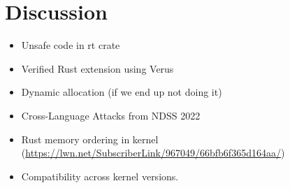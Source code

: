 \section{Discussion}
\begin{itemize}
    \item Unsafe code in rt crate
    \item Verified Rust extension using Verus
    \item Dynamic allocation (if we end up not doing it)
    \item Cross-Language Attacks from NDSS 2022
    \item Rust memory ordering in kernel (\url{https://lwn.net/SubscriberLink/967049/66bfb6f365d164aa/})
    \item Compatibility \projname{} across kernel versions.
\end{itemize}